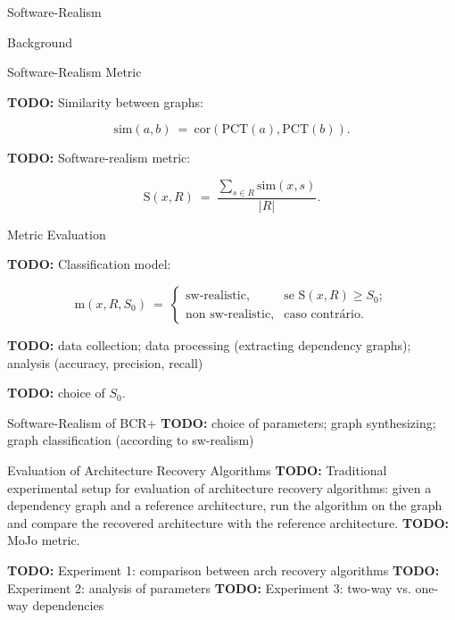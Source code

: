 \documentclass[11pt,twocolumn,a4paper,english]{article}
\newcommand{\TODO}{\textbf{TODO:} }
\begin{document}
\begin{section}{Software-Realism}
\begin{subsection}{Background}
	\end{subsection}
	
\begin{subsection}{Software-Realism Metric}
	
	
	\TODO Similarity between graphs:
	
	$$
  \mathrm{sim}(a, b) ~=~ 
    \mathrm{cor}(\mathrm{PCT}(a), \mathrm{PCT}(b))\mathrm{.}
  $$
	
	
	\TODO Software-realism metric:
	
	$$
  \mathrm{S}(x, R) ~=~ \frac{
  \displaystyle\sum_{s \in R} \mathrm{sim}(x, s)
  }{|R|} \mbox{.}
  $$

\end{subsection}
	
\begin{subsection}{Metric Evaluation}
	
	\TODO Classification model:
	
	$$
	  \mathrm{m}(x, R, S_0) ~=~
	  \left\{
	  \begin{array}{cl}
	  \mbox{sw-realistic,} & \mbox{se } \mathrm{S}(x, R) \ge S_0; \\
	  \mbox{non sw-realistic,} & \mbox{caso contrário.}
	  \end{array}
	  \right.
	$$	
	
	\TODO data collection; data processing (extracting dependency graphs); analysis (accuracy, precision, recall)
	
	\TODO choice of $S_0$.
	
\end{subsection}
	
\begin{subsection}{Software-Realism of BCR+}
	\TODO choice of parameters; graph synthesizing; graph classification (according to sw-realism)
\end{subsection}
	
\end{section}


\begin{section}{Evaluation of Architecture Recovery Algorithms}
	\TODO Traditional experimental setup for evaluation of architecture recovery algorithms: given a dependency graph and a reference architecture, run the algorithm on the graph and compare the recovered architecture with the reference architecture.
	\TODO MoJo metric.
	
	\TODO Experiment 1: comparison between arch recovery algorithms
	\TODO Experiment 2: analysis of parameters
	\TODO Experiment 3: two-way vs. one-way dependencies
\end{section}
\end{document}
